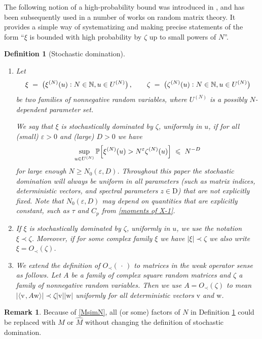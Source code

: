 \documentclass[11pt]{article} %
\numberwithin{equation}{section}
\numberwithin{figure}{section}
\theoremstyle{plain} %
\newtheorem{definition}[theorem]{Definition}
\theoremstyle{definition} %
\newtheorem{remark}[theorem]{Remark}
\newcommand{\f}[1]{\boldsymbol{\mathrm{#1}}} %
\newcommand{\wh}{\widehat}
\renewcommand{\P}{\mathbb{P}}
\newcommand{\N}{\mathbb{N}}
\newcommand{\col}{\mathrel{\vcenter{\baselineskip0.75ex \lineskiplimit0pt \hbox{.}\hbox{.}}}}
\renewcommand{\leq}{\leqslant}
\renewcommand{\geq}{\geqslant}
\renewcommand{\epsilon}{\varepsilon}
\newcommand{\pb}[1]{\bigl({#1}\bigr)}
\newcommand{\qB}[1]{\Bigl[{#1}\Bigr]}
\newcommand{\abs}[1]{\lvert #1 \rvert}
\newcommand{\scalar}[2]{\langle{#1} \mspace{2mu}, {#2}\rangle}
\newcommand{\e}{{\varepsilon}}
\begin{document}
The following notion of a high-probability bound was introduced in \cite{EKY2}, and has been subsequently used in a number of works on random matrix theory. It provides a simple way of systematizing and making precise statements of the form ``$\xi$ is bounded with high probability by $\zeta$ up to small powers of $N$''.


\begin{definition}[Stochastic domination]\label{def:stocdom}
\begin{enumerate}
\item
Let
\begin{equation*}
\xi \;=\; \pb{\xi^{(N)}(u) \col N \in \N, u \in U^{(N)}} \,, \qquad
\zeta \;=\; \pb{\zeta^{(N)}(u) \col N \in \N, u \in U^{(N)}}
\end{equation*}
be two families of nonnegative random variables, where $U^{(N)}$ is a possibly $N$-dependent parameter set. 

We say that $\xi$ is \emph{stochastically dominated by $\zeta$, uniformly in $u$,} if for all (small) $\epsilon > 0$ and (large) $D > 0$ we have
\begin{equation*}
\sup_{u \in U^{(N)}} \P \qB{\xi^{(N)}(u) > N^\epsilon \zeta^{(N)}(u)} \;\leq\; N^{-D}
\end{equation*}
for large enough $N\geq N_0(\e, D)$.
Throughout this paper the stochastic domination will always be uniform in all parameters (such as matrix indices, deterministic vectors, and spectral parameters $z \in \f D$) that are not explicitly fixed. Note that $N_0(\e, D)$ may depend on quantities that are explicitly constant, such as $\tau$ and $C_p$ from \eqref{moments of X-1}.
\item
If $\xi$ is stochastically dominated by $\zeta$, uniformly in $u$, we use the notation $\xi \prec \zeta$. Moreover, if for some complex family $\xi$ we have $\abs{\xi} \prec \zeta$ we also write $\xi = O_\prec(\zeta)$.
\item
We extend the definition of $O_\prec(\,\cdot\,)$ to matrices in the weak operator sense as follows. Let $A$ be a family of complex square random matrices and $\zeta$ a family of nonnegative random variables. Then we use $A = O_\prec(\zeta)$ to mean $\abs{\scalar{\f v}{A \f w}} \prec \zeta \abs{\f v}\abs{\f w}$ uniformly for all deterministic vectors $\f v$ and $\f w$.
\end{enumerate}
\end{definition}



\begin{remark}
Because of \eqref{MsimN}, all (or some) factors of $N$ in Definition \ref{def:stocdom} could be replaced with $M$ or $\wh M$ without changing the definition of stochastic domination. 
\end{remark}
\end{document}
